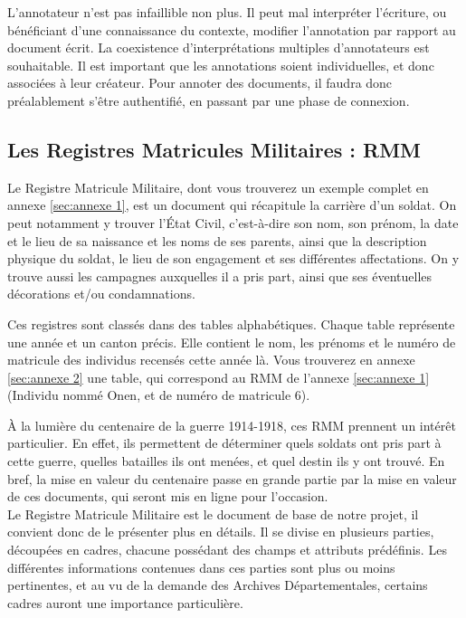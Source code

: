 \documentclass[a4paper]{article}
\begin{document}
L'annotateur n'est pas infaillible non plus. Il peut mal interpr\'eter l'\'ecriture, ou b\'en\'eficiant d'une connaissance du contexte, modifier l'annotation par rapport au document \'ecrit. La coexistence d'interpr\'etations multiples d'annotateurs est souhaitable. Il est important que les annotations soient individuelles, et donc associ\'ees \`a leur cr\'eateur. Pour annoter des documents, il faudra donc pr\'ealablement s'\^etre authentifi\'e, en passant par une phase de connexion.


\subsection{Les Registres Matricules Militaires : RMM}
\label{subsec:rmm}

	Le Registre Matricule Militaire, dont vous trouverez un exemple complet en annexe \ref{sec:annexe 1}, est un document qui r\'ecapitule la carri\`ere d'un soldat. On peut notamment y trouver l'\'Etat Civil, c'est-\`a-dire son nom, son pr\'enom, la date et le lieu de sa naissance et les noms de ses parents, ainsi que la description physique du soldat, le lieu de son engagement et ses diff\'erentes affectations. On y trouve aussi les campagnes auxquelles il a pris part, ainsi que ses \'eventuelles d\'ecorations et/ou condamnations.
    
    Ces registres sont class\'es dans des tables alphab\'etiques. Chaque table repr\'esente une ann\'ee et un canton pr\'ecis. Elle contient le nom, les pr\'enoms et le num\'ero de matricule des individus recens\'es cette ann\'ee l\`a. Vous trouverez en annexe \ref{sec:annexe 2} une table, qui correspond au RMM de l'annexe \ref{sec:annexe 1} (Individu nomm\'e Onen, et de num\'ero de matricule 6).
    
    \`A la lumi\`ere du centenaire de la guerre 1914-1918, ces RMM prennent un int\'er\^et particulier. En effet, ils permettent de d\'eterminer quels soldats ont pris part \`a cette guerre, quelles batailles ils ont men\'ees, et quel destin ils y ont trouv\'e. En bref, la mise en valeur du centenaire passe en grande partie par la mise en valeur de ces documents, qui seront mis en ligne pour l'occasion.
\\

	Le Registre Matricule Militaire est le document de base de notre projet, il convient donc de le pr\'esenter plus en d\'etails. Il se divise en plusieurs parties, d\'ecoup\'ees en cadres, chacune poss\'edant des champs et attributs pr\'ed\'efinis. Les diff\'erentes informations contenues dans ces parties sont plus ou moins pertinentes, et au vu de la demande des Archives D\'epartementales, certains cadres auront une importance particuli\`ere.
    
\end{document}
